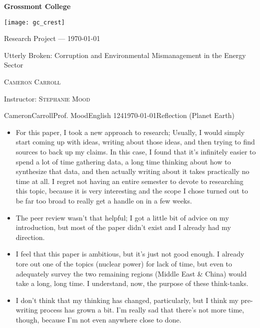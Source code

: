 \documentclass[11pt,letterpaper]{article}
\begin{document}
\thispagestyle{empty}
\begin{spacing}{1.5}
\begin{center}
{\Large \bfseries
Grossmont College}

\vspace*{10mm}

\texttt{[image: gc\_crest]}

\vspace*{15mm}
{\large Research Project --- \today
}

\vspace*{10mm}



\LARGE Utterly Broken: Corruption and Environmental Mismanagement in the Energy Sector

\vspace*{20mm}

{\large \textsc{ Cameron Carroll}
}

\vspace*{20mm}

\small{Instructor: \textsc{Stephanie Mood}}

\end{center}
\end{spacing}

\newpage
\setcounter{page}{1}




\newpage
\thispagestyle{empty}

\begin{mla}{Cameron}{Carroll}{Prof. Mood}{English 124}{\today}{Reflection (Planet Earth)}
\begin{itemize}
\item For this paper, I took a new approach to research; Usually, I would simply start coming up with ideas, writing about those ideas, and then trying to find sources to back up my claims. In this case, I found that it's infinitely easier to spend a lot of time gathering data, a long time thinking about how to synthesize that data, and then actually writing about it takes practically no time at all. I regret not having an entire semester to devote to researching this topic, because it is very interesting and the scope I chose turned out to be far too broad to really get a handle on in a few weeks. 
\item The peer review wasn't that helpful; I got a little bit of advice on my introduction, but most of the paper didn't exist and I already had my direction. 
\item I feel that this paper is ambitious, but it's just not good enough. I already tore out one of the topics (nuclear power) for lack of time, but even to adequately survey the two remaining regions (Middle East \& China) would take a long, long time. I understand, now, the purpose of these think-tanks.
\item I don't think that my thinking has changed, particularly, but I think my pre-writing process has grown a bit. I'm really sad that there's not more time, though, because I'm not even anywhere close to done.
\end{itemize}
\end{mla}
\end{document}
